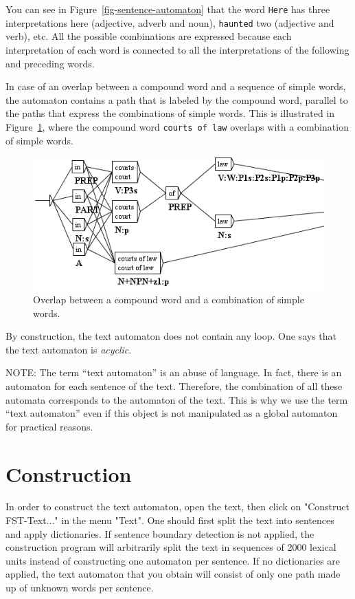 \bigskip
\noindent You can see in Figure~\ref{fig-sentence-automaton}
that the word \verb+Here+ has three interpretations here (adjective, adverb and noun),
\verb+haunted+ two (adjective and verb), etc. All the possible combinations are
expressed because each interpretation of each word is connected to all the
interpretations of the following and preceding words.

\bigskip
\noindent In case of an overlap between a compound word and a sequence of simple words,
the automaton contains a path that is labeled by the compound word, parallel to
the paths that express the combinations of simple words. This is illustrated in
Figure~\ref{fig-overlap}, where the compound word
\texttt{courts of law} overlaps with a combination of simple words.

\begin{figure}[!ht]
\begin{center}
\includegraphics[width=12.5cm]{resources/img/fig7-2.png}
\caption{Overlap between a compound word and a combination of simple
words.\label{fig-overlap}}
\end{center}
\end{figure}

\bigskip
\noindent By construction, the text automaton does not contain any
loop. One says that the text automaton is \textit{acyclic}.

\bigskip
\noindent NOTE: The term ``text automaton'' is an abuse of language. In fact, there is an
automaton for each sentence of the text. Therefore, the combination of all these 
automata corresponds to the automaton
of the text. This is why we use the term ``text automaton'' even if this object
is not manipulated as a global automaton for practical reasons.

\section{Construction}
In order to construct the text automaton, open the text, then click on 
"Construct FST-Text..." in the menu "Text". One should first split the text into
sentences and  apply dictionaries. If sentence boundary detection
is not applied, the construction program will arbitrarily split the text in
sequences of 2000 lexical units instead of constructing one automaton per
sentence. If no dictionaries are applied, the text automaton that you
obtain will consist of only one path made up of unknown words per sentence.


